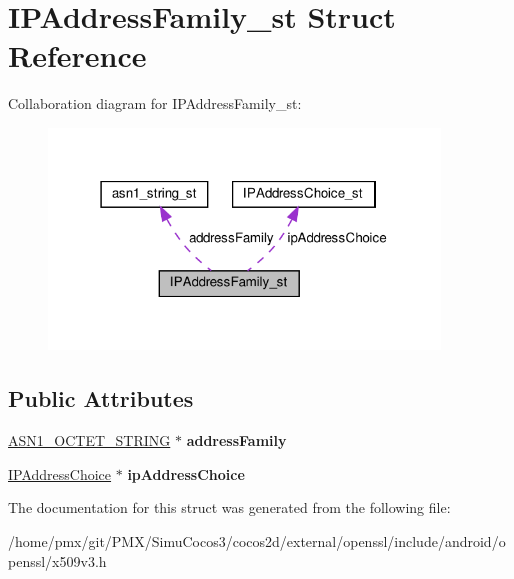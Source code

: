 \hypertarget{structIPAddressFamily__st}{}\section{I\+P\+Address\+Family\+\_\+st Struct Reference}
\label{structIPAddressFamily__st}


Collaboration diagram for I\+P\+Address\+Family\+\_\+st\+:
\nopagebreak
\begin{figure}[H]
\begin{center}
\leavevmode
\includegraphics[width=295pt]{structIPAddressFamily__st__coll__graph}
\end{center}
\end{figure}
\subsection*{Public Attributes}
\begin{DoxyCompactItemize}
\item 
\mbox{\label{structIPAddressFamily__st_a484fac306fd31d2d5b826a65f93d7891}} 
\hyperlink{structasn1__string__st}{A\+S\+N1\+\_\+\+O\+C\+T\+E\+T\+\_\+\+S\+T\+R\+I\+NG} $\ast$ {\bfseries address\+Family}
\item 
\mbox{\label{structIPAddressFamily__st_a888787742212c2caf7a7f8e59e895865}} 
\hyperlink{structIPAddressChoice__st}{I\+P\+Address\+Choice} $\ast$ {\bfseries ip\+Address\+Choice}
\end{DoxyCompactItemize}


The documentation for this struct was generated from the following file\+:\begin{DoxyCompactItemize}
\item 
/home/pmx/git/\+P\+M\+X/\+Simu\+Cocos3/cocos2d/external/openssl/include/android/openssl/x509v3.\+h\end{DoxyCompactItemize}
